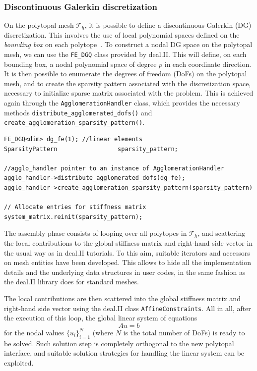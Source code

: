 \documentclass[a4paper,12pt]{article}
\begin{document}
\subsubsection{Discontinuous Galerkin discretization}

On the polytopal mesh $\mathcal{T}_h$, it is possible to define a discontinuous
Galerkin (DG) discretization. This involves the use of local polynomial
spaces defined on the \emph{bounding box} on each polytope~\cite{polyDG}. To construct a nodal
DG space on the polytopal mesh, we can use the \texttt{FE\_DGQ} class provided by deal.II. This will define,
on each bounding box, a nodal polynomial space of degree $p$ in each coordinate direction. It is then possible to enumerate
the degrees of freedom (DoFs) on the polytopal mesh, and to
create the sparsity pattern associated with the discretization space, necessary to initialize
sparse matrix associated with the problem. This is achieved
again through the \texttt{AgglomerationHandler} class, which provides the necessary methods
\texttt{distribute\_agglomerated\_dofs()} and \texttt{create\_agglomeration\_sparsity\_pattern()}.


\begin{lstlisting}[caption=Distribution of DoFs on a polytopal mesh]
FE_DGQ<dim> dg_fe(1); //linear elements
SparsityPattern                 sparsity_pattern;

//agglo_handler pointer to an instance of AgglomerationHandler
agglo_handler->distribute_agglomerated_dofs(dg_fe);
agglo_handler->create_agglomeration_sparsity_pattern(sparsity_pattern)

// Allocate entries for stiffness matrix
system_matrix.reinit(sparsity_pattern);
\end{lstlisting}

The assembly phase consists of looping over all polytopes in $\mathcal{T}_h$, and
scattering the local contributions to the global stiffness matrix and
right-hand side vector in the usual way as in deal.II tutorials.
To this aim, suitable iterators and accessors on mesh entities have been developed. This allows
to hide all the implementation details and the underlying data structures in user codes, in the same fashion
as the deal.II library does for standard meshes.

The local contributions are then scattered into the global
stiffness matrix and right-hand side vector using the deal.II class \texttt{AffineConstraints}. All in all,
after the execution of this loop, the global linear system of equations $$Au = b$$ for the nodal values $\{u_i\}_{i=1}^N$ (where $N$ is the total number
of DoFs) is ready to be solved. Such solution
step is completely orthogonal to the new polytopal interface, and suitable solution strategies for
handling the linear system can be exploited.
\end{document}
